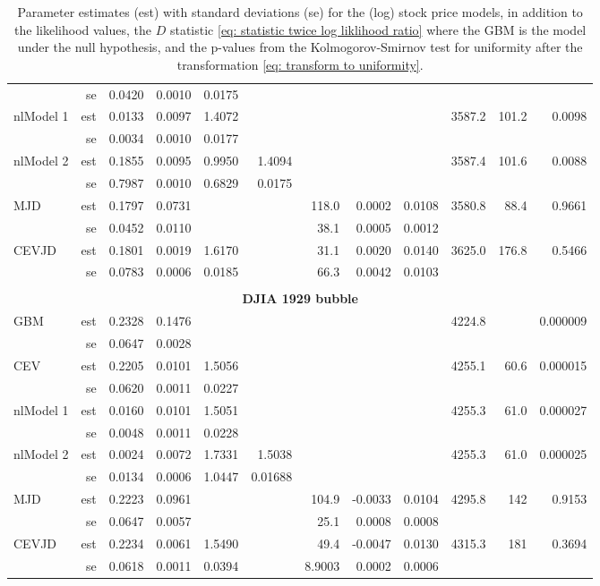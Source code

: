 \begin{table}
{\begin{tabular}{@{}lrrrrrrrrrrr@{}}
			& se & 0.0420 & 0.0010 & 0.0175 & \\
			nlModel 1& est & 0.0133 &  0.0097 & 1.4072 & & & & & 3587.2 & 101.2 & 0.0098 \\
			& se & 0.0034& 0.0010& 0.0177& \\
			nlModel 2 & est & 0.1855 & 0.0095 & 0.9950 & 1.4094 & & & & 3587.4 & 101.6 & 0.0088 \\
			& se & 0.7987 & 0.0010 & 0.6829 & 0.0175 & \\
			MJD& est& 0.1797 & 0.0731& & & 118.0 & 0.0002& 0.0108 & 3580.8& 88.4 & 0.9661 \\
			& se& 0.0452& 0.0110 & & & 38.1 & 0.0005 & 0.0012 & & \\
			CEVJD & est & 0.1801 & 0.0019 & 1.6170 & &  31.1 & 0.0020 & 0.0140 & 3625.0 & 176.8 & 0.5466 \\
			& se & 0.0783 & 0.0006 & 0.0185 & & 66.3 & 0.0042 & 0.0103 &  & \\
			\\
			\multicolumn{12}{c}{\textbf{DJIA 1929 bubble}}\\
			GBM& est & 0.2328  & 0.1476  &  & & & & & 4224.8  & & 0.000009\\
			& se & 0.0647& 0.0028& & & & & & & \\
			CEV& est & 0.2205 & 0.0101 & 1.5056 & & & & & 4255.1 & 60.6 & 0.000015\\
			& se & 0.0620 & 0.0011 & 0.0227 & & \\
			nlModel 1& est & 0.0160 &  0.0101 & 1.5051 &  & & & & 4255.3& 61.0 & 0.000027 \\
			& se & 0.0048& 0.0011& 0.0228& &  \\
			nlModel 2 & est & 0.0024 & 0.0072 & 1.7331 & 1.5038 & & & & 4255.3 & 61.0 & 0.000025\\
			& se & 0.0134 & 0.0006 & 1.0447 & 0.01688 & \\
			MJD& est& 0.2223& 0.0961& & & 104.9&-0.0033& 0.0104& 4295.8& 142 & 0.9153 \\
			& se& 0.0647& 0.0057& & & 25.1 & 0.0008& 0.0008 & & \\
			CEVJD & est &  0.2234 & 0.0061 & 1.5490 & & 49.4 & -0.0047 & 0.0130 & 4315.3 & 181 & 0.3694 \\
			& se & 0.0618 & 0.0011 & 0.0394 & & 8.9003 & 0.0002 & 0.0006 & \\
			\bottomrule
		\end{tabular}}
		\caption[Parameter estimates for empirical data] {Parameter estimates (est) with standard deviations (se) for the (log) stock price models, 
			in addition to the likelihood values, 
			the $D$ statistic \eqref{eq: statistic twice log liklihood ratio} where the GBM is the model under the null hypothesis,
			and the p-values from the Kolmogorov-Smirnov test for uniformity after the transformation \eqref{eq: transform to uniformity}. }
		\label{tab: Parameter estimates stock prices}
	\end{table}
	

